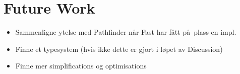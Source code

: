 \chapter{Future Work}
\label{chapter:future}
\begin{itemize}	
  \item Sammenligne ytelse med Pathfinder n\aa r Fast har f\aa tt p\aa~plass en impl.
  \item Finne et typesystem (hvis ikke dette er gjort i l\o pet av Discussion)
  \item Finne mer simplifications og optimisations
\end{itemize}

